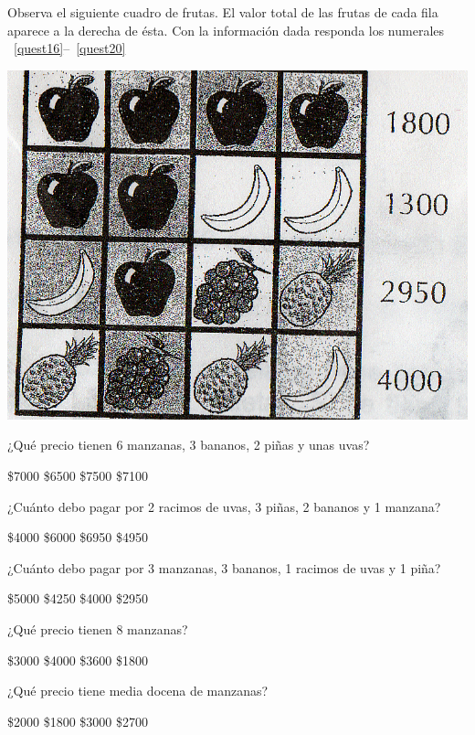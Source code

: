 \documentclass[10pt,letterpaper,addpoints]{exam}
\begin{document}
\begin{questions}
\begin{minipage}{0.6\textwidth}{Observa el siguiente cuadro de frutas. El valor total de las frutas de cada fila aparece a la derecha de ésta. Con la información dada responda los numerales ~\ref{quest16}--~\ref{quest20}}
\end{minipage}\hfill
\begin{minipage}{0.4\textwidth}{\includegraphics[scale=.2]{Images/frutas.png}}
\end{minipage}
\question \label{quest16}
¿Qu\'e precio tienen 6 manzanas, 3 bananos, 2 piñas y unas uvas?

\begin{oneparchoices}
\choice \$7000
\choice \$6500
\choice \$7500
\CorrectChoice \$7100
\end{oneparchoices}
\question ¿Cuánto debo pagar por 2 racimos de uvas, 3 piñas, 2 bananos y 1 manzana?

\begin{oneparchoices}
\choice \$4000
\choice \$6000
\CorrectChoice \$6950
\choice \$4950
\end{oneparchoices}
\question
¿Cuánto debo pagar por 3 manzanas, 3 bananos, 1 racimos de uvas y 1 piña?

\begin{oneparchoices}
\choice \$5000
\CorrectChoice \$4250
\choice \$4000
\choice \$2950
\end{oneparchoices}
\question ¿Qué precio tienen 8 manzanas?

\begin{oneparchoices}
\choice \$3000
\choice \$4000
\CorrectChoice \$3600
\choice \$1800
\end{oneparchoices}
\question \label{quest20}
¿Qu\'e precio tiene media docena de manzanas?

\begin{oneparchoices}
\choice \$2000
\choice \$1800
\choice \$3000
\CorrectChoice \$2700
\end{oneparchoices}
\end{questions}
\end{document}
